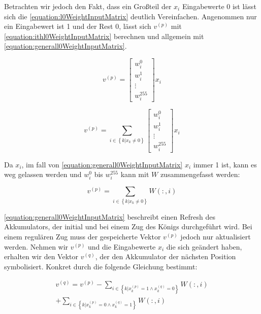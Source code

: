 Betrachten wir jedoch den Fakt, dass ein Großteil der $x_{i}$ Eingabewerte 0 ist lässt sich die \autoref{equation:l0WeightInputMatrix} deutlich Vereinfachen. Angenommen nur ein Eingabewert ist 1 und der Rest 0, lässt sich $v^{(p)}$ mit \autoref{equation:ithl0WeightInputMatrix} berechnen und allgemein mit \autoref{equation:generall0WeightInputMatrix}.

\begin{equation}
  v^{(p)}=\begin{bmatrix}
    w_{i}^{0} \\
    w_{i}^{1} \\
    \vdots    \\
    w_{i}^{255}
  \end{bmatrix} x_{i}
  \label{equation:ithl0WeightInputMatrix}
\end{equation}

\begin{equation}
  v^{(p)}= \sum_{i\in\left \{  k|x_{k}\neq 0\right \}} \begin{bmatrix}
    w_{i}^{0} \\
    w_{i}^{1} \\
    \vdots    \\
    w_{i}^{255}
  \end{bmatrix} x_{i}
  \label{equation:generall0WeightInputMatrix}
\end{equation}

Da $x_{i}$, im fall von \autoref{equation:generall0WeightInputMatrix} $x_{i}$ immer 1 ist, kann es weg gelassen werden und $w_{i}^{0}$ bis $w_{i}^{255}$ kann mit $W$ zusammengefasst werden:

\begin{equation}
  v^{(p)}= \sum_{i\in\left \{  k|x_{k}\neq 0\right \}} W(:,i)
  \label{equation:generall0WeightInputMatrixNoX}
\end{equation}

\autoref{equation:generall0WeightInputMatrix} beschreibt einen Refresh des Akkumulators, der initial und bei einem Zug des Königs durchgeführt wird. Bei einem regulären Zug muss der gespeicherte Vektor $v^{(p)}$ jedoch nur aktualisiert werden. Nehmen wir $v^{(p)}$ und die Eingabewerte $x_{i}$ die sich geändert haben, erhalten wir den Vektor $v^{(q)}$, der den Akkumulator der nächsten Position symbolisiert. Konkret durch die folgende Gleichung bestimmt:

\begin{equation}
  \begin{split}
    v^{(q)} = v^{(p)}
    - \sum_{i \in \left \{ k | x_{k}^{(p)}=1\wedge x_{k}^{(q)}=0 \right \}}^{} W(:,i) \\
    + \sum_{i \in \left \{ k | x_{k}^{(p)}=0\wedge x_{k}^{(q)}=1 \right \}}^{} W(:,i)
  \end{split}
  \label{equation:akkumulatoreAktualisierung}
\end{equation}

